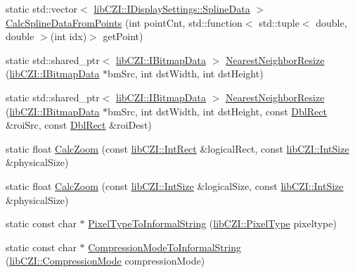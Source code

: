 \begin{DoxyCompactItemize}
\item 
static std\+::vector$<$ \hyperlink{structlib_c_z_i_1_1_i_display_settings_1_1_spline_data}{lib\+C\+Z\+I\+::\+I\+Display\+Settings\+::\+Spline\+Data} $>$ \hyperlink{classlib_c_z_i_1_1_utils_a1d09549e8c5202874d5adc0cc1baccf7}{Calc\+Spline\+Data\+From\+Points} (int point\+Cnt, std\+::function$<$ std\+::tuple$<$ double, double $>$(int idx)$>$ get\+Point)
\item 
static std\+::shared\+\_\+ptr$<$ \hyperlink{classlib_c_z_i_1_1_i_bitmap_data}{lib\+C\+Z\+I\+::\+I\+Bitmap\+Data} $>$ \hyperlink{classlib_c_z_i_1_1_utils_af19f5d15750c0949f3dd4ebb5684c7d3}{Nearest\+Neighbor\+Resize} (\hyperlink{classlib_c_z_i_1_1_i_bitmap_data}{lib\+C\+Z\+I\+::\+I\+Bitmap\+Data} $\ast$bm\+Src, int dst\+Width, int dst\+Height)
\item 
static std\+::shared\+\_\+ptr$<$ \hyperlink{classlib_c_z_i_1_1_i_bitmap_data}{lib\+C\+Z\+I\+::\+I\+Bitmap\+Data} $>$ \hyperlink{classlib_c_z_i_1_1_utils_a6d56f447db1707083cb47042729bfabf}{Nearest\+Neighbor\+Resize} (\hyperlink{classlib_c_z_i_1_1_i_bitmap_data}{lib\+C\+Z\+I\+::\+I\+Bitmap\+Data} $\ast$bm\+Src, int dst\+Width, int dst\+Height, const \hyperlink{structlib_c_z_i_1_1_dbl_rect}{Dbl\+Rect} \&roi\+Src, const \hyperlink{structlib_c_z_i_1_1_dbl_rect}{Dbl\+Rect} \&roi\+Dest)
\item 
static float \hyperlink{classlib_c_z_i_1_1_utils_aef8fdee9516bf45c9eaa4b28862aa8fc}{Calc\+Zoom} (const \hyperlink{structlib_c_z_i_1_1_int_rect}{lib\+C\+Z\+I\+::\+Int\+Rect} \&logical\+Rect, const \hyperlink{structlib_c_z_i_1_1_int_size}{lib\+C\+Z\+I\+::\+Int\+Size} \&physical\+Size)
\item 
static float \hyperlink{classlib_c_z_i_1_1_utils_ac62322c3e738d8a514ca5ee2dcbc6535}{Calc\+Zoom} (const \hyperlink{structlib_c_z_i_1_1_int_size}{lib\+C\+Z\+I\+::\+Int\+Size} \&logical\+Size, const \hyperlink{structlib_c_z_i_1_1_int_size}{lib\+C\+Z\+I\+::\+Int\+Size} \&physical\+Size)
\item 
static const char $\ast$ \hyperlink{classlib_c_z_i_1_1_utils_ac2b90922af21aa507257ac7f3d089542}{Pixel\+Type\+To\+Informal\+String} (\hyperlink{namespacelib_c_z_i_abf8ce12ab88b06c8b3b47efbb5e2e834}{lib\+C\+Z\+I\+::\+Pixel\+Type} pixeltype)
\item 
static const char $\ast$ \hyperlink{classlib_c_z_i_1_1_utils_a8866b5684bec94262510d6ff12bbdb2b}{Compression\+Mode\+To\+Informal\+String} (\hyperlink{namespacelib_c_z_i_a672959aa909ce27c5a549465200b08fb}{lib\+C\+Z\+I\+::\+Compression\+Mode} compression\+Mode)
\item 

\end{DoxyCompactItemize}
